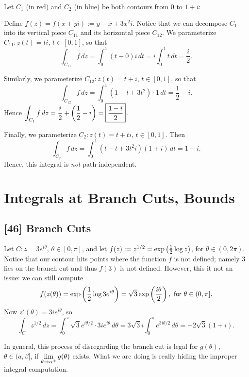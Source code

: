 \documentclass{article}
\begin{document}
\newpage
\begin{example}
Let $C_1$ (in red) and $C_2$ (in blue) be both contours from $0$ to $1+i$:
\begin{center}
\end{center}
Define $f(z) = f(x+yi) := y-x + 3x^2i$. Notice that we can decompose $C_1$ into its vertical piece $C_{11}$ and its horizontal piece $C_{12}$. We parameterize $C_{11}: z(t) = ti$, $t\in [0, 1]$, so that
$$\int_{C_{11}} f\, dz = \int_0^1 (t-0)i\, dt = i\int_0^1 t\, dt = \frac i2.$$

Similarly, we parameterize $C_{12}: z(t) = t+i$, $t\in [0, 1]$, so that
$$\int_{C_{12}} f\, dz = \int_0^1 (1 - t + 3t^2)\cdot 1\, dt = \frac 12-i.$$
Hence $\displaystyle\int_{C_1} f\, dz = \frac i2 + \left(\frac 12-i \right) = \boxed{\frac{1-i}2}$.
\vspace{0.2 cm}

Finally, we parameterize $C_2: z(t) = t+ti$, $t\in [0, 1]$. Then
$$\int_{C_2} f\, dz = \int_0^1 (t-t +3t^2i)(1+i)\, dt = \boxed{1-i}.$$
Hence, this integral is \textit{not} path-independent.
\end{example}
\setcounter{section}{53}
\section{Integrals at Branch Cuts, Bounds}
\subsection*{[46] Branch Cuts}
\begin{example}
Let $C: z=3e^{i\theta}$, $\theta\in [0, \pi]$, and let $f(z) := z^{1/2} = \exp\left(\frac 12\log z \right)$, for $\theta\in (0, 2\pi)$. Notice that our contour hits points where the function $f$ is not defined; namely $3$ lies on the branch cut and thus $f(3)$ is not defined. However, this it not an issue: we can still compute
$$f(z(\theta)) = \exp\left(\frac 12\log3e^{i\theta} \right) = \sqrt 3\exp\left(\frac{i\theta}2 \right), \textsf{ for } \theta\in (0, \pi].$$
Now $z'(\theta) = 3ie^{i\theta}$, so
$$\int_C z^{1/2}\, dz = \int_0^\pi \sqrt 3e^{i\theta/2}\cdot 3ie^{i\theta}\, d\theta = 3\sqrt 3i\int_0^\pi e^{3i\theta/2}\, d\theta = \boxed{-2\sqrt 3(1+i)}.$$
\end{example}
In general, this process of disregarding the branch cut is legal for $g(\theta)$, $\theta\in (a, \beta]$, if $\displaystyle\lim_{\theta\to \alpha^+} g(\theta)$ exists. What we are doing is really hiding the improper integral computation.
\end{document}
